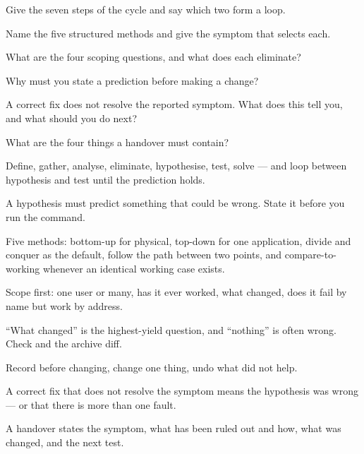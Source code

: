 \begin{checkpoint}
\begin{tightnum}
  \item Give the seven steps of the cycle and say which two form a loop.
  \item Name the five structured methods and give the symptom that selects each.
  \item What are the four scoping questions, and what does each eliminate?
  \item Why must you state a prediction before making a change?
  \item A correct fix does not resolve the reported symptom. What does this tell
        you, and what should you do next?
  \item What are the four things a handover must contain?
\end{tightnum}
\end{checkpoint}

\begin{chaptersummary}
\begin{tight}
  \item Define, gather, analyse, eliminate, hypothesise, test, solve --- and loop
        between hypothesis and test until the prediction holds.
  \item A hypothesis must predict something that could be wrong. State it before
        you run the command.
  \item Five methods: bottom-up for physical, top-down for one application,
        divide and conquer as the default, follow the path between two points,
        and compare-to-working whenever an identical working case exists.
  \item Scope first: one user or many, has it ever worked, what changed, does it
        fail by name but work by address.
  \item ``What changed'' is the highest-yield question, and ``nothing'' is often
        wrong. Check  and the archive diff.
  \item Record before changing, change one thing, undo what did not help.
  \item A correct fix that does not resolve the symptom means the hypothesis was
        wrong --- or that there is more than one fault.
  \item A handover states the symptom, what has been ruled out and how, what was
        changed, and the next test.
\end{tight}
\end{chaptersummary}

